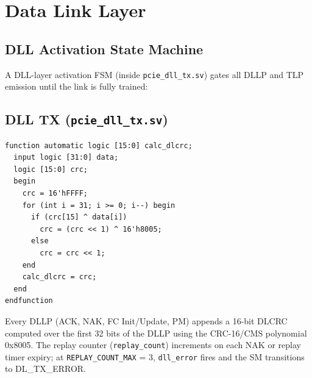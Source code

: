 \documentclass[12pt,a4paper]{report}
\begin{document}
\section{Data Link Layer}

\subsection{DLL Activation State Machine}\label{sec:dll-sm}

A DLL-layer activation FSM (inside \texttt{pcie\_dll\_tx.sv}) gates all DLLP
and TLP emission until the link is fully trained:

\begin{center}
\end{center}

\subsection{DLL TX (\texttt{pcie\_dll\_tx.sv})}

\begin{lstlisting}[caption={DLCRC-16 function from \texttt{pcie\_pkg.sv}},label=lst:dlcrc]
function automatic logic [15:0] calc_dlcrc;
  input logic [31:0] data;
  logic [15:0] crc;
  begin
    crc = 16'hFFFF;
    for (int i = 31; i >= 0; i--) begin
      if (crc[15] ^ data[i])
        crc = (crc << 1) ^ 16'h8005;
      else
        crc = crc << 1;
    end
    calc_dlcrc = crc;
  end
endfunction
\end{lstlisting}

Every DLLP (ACK, NAK, FC Init/Update, PM) appends a 16-bit DLCRC computed
over the first 32 bits of the DLLP using the CRC-16/CMS polynomial 0x8005.
The replay counter (\texttt{replay\_count}) increments on each NAK or replay
timer expiry; at \texttt{REPLAY\_COUNT\_MAX} = 3, \texttt{dll\_error} fires
and the SM transitions to DL\_TX\_ERROR.
\end{document}

